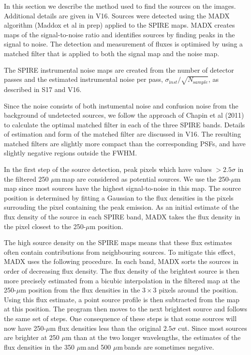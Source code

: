 \documentclass[useAMS,usenatbib]{mn2e}
\def\mic{ $\mu $m\,}
\begin{document}
In this section we describe the method used to find the
sources on the images. Additional details are given in V16.
Sources were detected using the MADX algorithm (Maddox et al in prep)
applied to the SPIRE maps.  MADX creates maps of the signal-to-noise
ratio and identifies sources by finding peaks in the signal to noise. The
detection and measurement of fluxes is optimised by using a matched
filter that is applied to both the signal map and the noise map. 

The SPIRE instrumental noise maps are created from the number of
detector passes and the estimated instrumental noise per pass,
$\sigma_{\mathrm inst} /\sqrt{N_ {\mathrm sample}}$, as described in S17 and V16.

 
Since the noise consists of both instumental noise and
confusion noise from the background of undetected sources, we follow
the approach of Chapin et al (2011) to calculate the optimal matched
filter in each of the three SPIRE bands. Details of estimation and
form of the matched filter are discussed in V16.  The resulting
matched filters are slightly more compact than the corresponding PSFs,
and have slightly negative regions outside the FWHM.  

In the first step of the source detection, peak pixels which have
values $>2.5\sigma$ in the filtered 250\mic map are considered as
potential sources. 
We use the 250-$\mu$m map since most sources
have the highest signal-to-noise in this map.
The source 
position is determined by
fitting a Gaussian to the flux densities in the pixels surrouding
the pixel containing the peak emission.
As an initial estimate of the flux density of the
source in each SPIRE band, MADX takes the flux density in the
pixel closest to the 250-$\mu$m position.

The high source density on the SPIRE maps means that these flux estimates
often contain contributions from neighbouring sources.
To mitigate this effect, MADX uses the following procedure.
In each band, MADX sorts the sources in order of decreasing flux
density.
The
flux density of the brightest source is then
more precisely estimated from a bicubic interpolation
in the filtered map at the
250-$\mu$m position from the flux densities in the
$3 \times 3$ pixels around the position. 
Using this flux estimate, a point source profile is then subtracted
from the map at this position. The program then moves to the
next brightest source and follows the same set of steps.
One consequence of these steps
is that some sources will now have 250-$\mu$m flux densities
less than the
original $2.5\sigma$ cut. 
Since most sources are brighter at 250 $\mu$m than at the two
longer wavelengths, the estimates of the flux densities in the
350\mic and 500\mic bands are sometimes negative.
\end{document}

